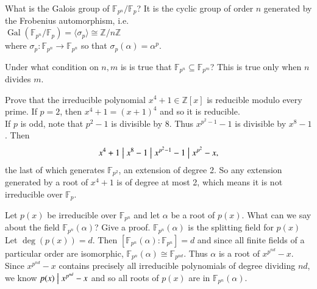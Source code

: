 \documentclass[avery5371,grid]{flashcards}
\newcommand{\Z}{\mathbb{Z}}
\newcommand{\F}{\mathbb{F}}
\newcommand{\divides}{\bigm|}
\DeclareMathOperator{\Gal}{Gal}
\begin{document}
\begin{flashcard}[Fields]{What is the Galois group of $\F_{p^n}/\F_p$?}
 It is the cyclic group of order $n$ generated by the Frobenius automorphism, i.e.\\
 
 $\Gal(\F_{p^n}/\F_p) = \langle \sigma_p \rangle \cong \Z/n\Z$\\
 
 where $\sigma_p: \F_{p^n} \to \F_{p^n}$ so that $\sigma_p(\alpha) = \alpha^p$.
\end{flashcard}

\begin{flashcard}[Fields]{Under what condition on $n,m$ is is true that $\F_{p^n} \subseteq \F_{p^m}$?}
 This is true only when $n$ divides $m$.
\end{flashcard}

\begin{flashcard}[Fields]{Prove that the irreducible polynomial $x^4 + 1 \in \Z[x]$ is reducible modulo every prime.}
 If $p=2$, then $x^4+1 = (x+1)^4$ and so it is reducible.\\
 
 If $p$ is odd, note that $p^2-1$ is divisible by 8. Thus $x^{p^2 - 1} - 1$ is divisible by $x^8-1$. Then
 $$
 x^4+1 \divides x^8 - 1 \divides x^{p^2 - 1} - 1 \divides x^{p^2}-x,
 $$
 the last of which generates $\F_{p^2}$, an extension of degree 2. So any extension generated by a root of $x^4 +1$ is of degree at most 2, which means it is not irreducible over $\F_p$.
\end{flashcard}

\begin{flashcard}[Fields]{Let $p(x)$ be irreducible over $\F_{p^n}$ and let $\alpha$ be a root of $p(x)$. What can we say about the field $\F_{p^n}(\alpha)$? Give a proof.}
 $\F_{p^n}(\alpha)$ is the splitting field for $p(x)$\\
 
 Let $\deg(p(x)) = d$. Then $[\F_{p^n}(\alpha):\F_{p^n}] = d$ and since all finite fields of a particular order are isomorphic, $\F_{p^n}(\alpha) \cong \F_{p^{nd}}$. Thus $\alpha$ is a root of $x^{p^{nd}} - x$. Since $x^{p^{nd}} - x$ contains precisely all irreducible polynomials of degree dividing $nd$, we know $p(x) \divides x^{p^{nd}} - x$ and so all roots of $p(x)$ are in $\F_{p^n}(\alpha)$.
\end{flashcard}
\end{document}
